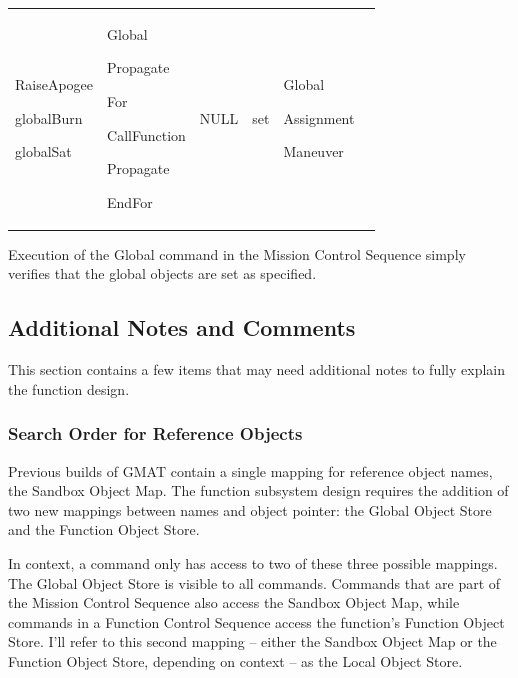 \begin{center}
\begin{supertabular}{|p{0.95in}|p{0.95in}|p{0.95in}|p{0.95in}|p{0.95in}|p{0.95in}|}
\begin{small}
RaiseApogee

globalBurn

globalSat
\end{small} &
\begin{small}
Global

Propagate

For

CallFunction

Propagate

EndFor
\end{small} &
\begin{small}
NULL
\end{small} &
\begin{small}
set
\end{small} &
\begin{small}
Global

Assignment

Maneuver
\end{small} \\
\end{supertabular}
\end{center}

\noindent Execution of the Global command in the Mission Control Sequence simply verifies that the
global objects are set as specified.

\subsection{Additional Notes and Comments}
This section contains a few items that may need additional notes to fully explain the function
design.

\subsubsection{Search Order for Reference Objects}
Previous builds of GMAT contain a single mapping for reference object names, the Sandbox Object Map.
 The function subsystem design requires the addition of two new mappings between names and object
pointer: the Global Object Store and the Function Object Store.  

In context, a command only has access to two of these three possible mappings.  The Global Object
Store is visible to all commands.  Commands that are part of the Mission Control Sequence also
access the Sandbox Object Map, while commands in a Function Control Sequence access the function's
Function Object Store.  I'll refer to this second mapping -- either the Sandbox Object Map or the
Function Object Store, depending on context -- as the Local Object Store.

